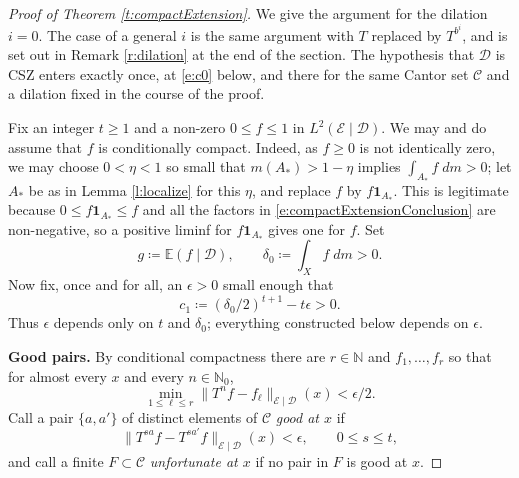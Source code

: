 \begin{proof}[Proof of Theorem \ref{t:compactExtension}]
We give the argument for the dilation $i=0$.  The case of a general $i$ is the same argument with $T$ replaced by $T ^{b ^{i}}$, 
and is set out in Remark \ref{r:dilation} at the end of the section.  
The hypothesis that $\mathcal D$ is CSZ enters exactly once, at \eqref{e:c0} below, and there for the same Cantor set $\mathcal C$ 
and a dilation fixed in the course of the proof.  

Fix an integer $t \geq 1$ and a non-zero $0 \leq f \leq 1$ in $L^2(\mathcal E \mid \mathcal D)$.   
We may and do assume that $f$ is conditionally compact.  Indeed, as $f \geq 0$ is not identically zero, we may choose $0<\eta <1$ so small 
that $m(A_\ast) > 1- \eta$ implies $\int_{A_\ast} f \;dm > 0$; let $A_\ast$ be as in Lemma \ref{l:localize} for this $\eta$, and replace $f$ by $f \mathbf 1_{A_\ast}$.  
This is legitimate because $0 \leq f \mathbf 1_{A_\ast} \leq f$ and all the factors in \eqref{e:compactExtensionConclusion} are non-negative, 
so a positive liminf for $f \mathbf 1_{A_\ast}$ gives one for $f$.  
Set 
\begin{equation}
g \coloneqq \mathbb E (f \mid \mathcal D), \qquad \delta _0 \coloneqq \int_X f \;dm >0 . 
\end{equation}
Now fix, once and for all, an $\epsilon >0$ small enough that 
\begin{equation} \label{e:epschoice}
c_1 \coloneqq ( \delta _0/2) ^{t+1} - t \epsilon >0 . 
\end{equation}
Thus $\epsilon$ depends only on $t$ and $\delta _0$; everything constructed below depends on $\epsilon$.  

\smallskip 
\noindent \textbf{Good pairs.}  
By conditional compactness there are $r \in \mathbb N$ and $f_1 , \ldots, f_r$ so that for almost every $x$ and every $n \in \mathbb N_0$, 
\begin{equation} \label{e:net}
\min_{1 \leq \ell \leq r} \lVert T^{n}f - f_\ell \rVert _{\mathcal E \mid \mathcal D}(x) < \epsilon /2 . 
\end{equation}
Call a pair $\{a, a'\}$ of distinct elements of $\mathcal C$ \emph{good at $x$} if 
\begin{equation}
\lVert T^{sa}f - T ^{sa'}f \rVert _{\mathcal E \mid \mathcal D}(x) < \epsilon , \qquad 0 \leq s \leq t , 
\end{equation}
and call a finite $F \subset \mathcal C$ \emph{unfortunate at $x$} if no pair in $F$ is good at $x$.  


\end{proof}
